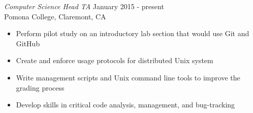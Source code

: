 {\sl Computer Science Head TA} \hfill January 2015 - present \\
Pomona College, Claremont, CA
\begin{itemize} \itemsep -2pt %
\item Perform pilot study on an introductory lab section that would use Git and GitHub
\item Create and enforce usage protocols for distributed Unix system
\item Write management scripts and Unix command line tools to improve the grading process
\item Develop skills in critical code analysis, management, and bug-tracking
\end{itemize}
